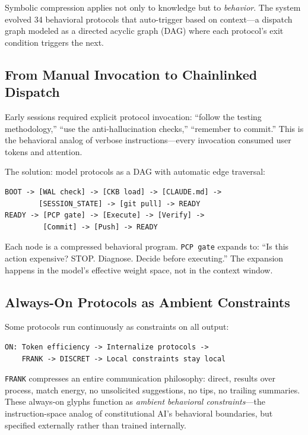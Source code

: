 \documentclass[11pt, a4paper]{article}
\begin{document}
Symbolic compression applies not only to knowledge but to \emph{behavior}. The system evolved 34 behavioral protocols that auto-trigger based on context---a dispatch graph modeled as a directed acyclic graph (DAG) where each protocol's exit condition triggers the next.

\subsection{From Manual Invocation to Chainlinked Dispatch}

Early sessions required explicit protocol invocation: ``follow the testing methodology,'' ``use the anti-hallucination checks,'' ``remember to commit.'' This is the behavioral analog of verbose instructions---every invocation consumed user tokens and attention.

The solution: model protocols as a DAG with automatic edge traversal:

\begin{lstlisting}
BOOT -> [WAL check] -> [CKB load] -> [CLAUDE.md] ->
        [SESSION_STATE] -> [git pull] -> READY
READY -> [PCP gate] -> [Execute] -> [Verify] ->
         [Commit] -> [Push] -> READY
\end{lstlisting}

Each node is a compressed behavioral program. \texttt{PCP gate} expands to: ``Is this action expensive? STOP. Diagnose. Decide before executing.'' The expansion happens in the model's effective weight space, not in the context window.

\subsection{Always-On Protocols as Ambient Constraints}

Some protocols run continuously as constraints on all output:

\begin{lstlisting}
ON: Token efficiency -> Internalize protocols ->
    FRANK -> DISCRET -> Local constraints stay local
\end{lstlisting}

\texttt{FRANK} compresses an entire communication philosophy: direct, results over process, match energy, no unsolicited suggestions, no tips, no trailing summaries. These always-on glyphs function as \emph{ambient behavioral constraints}---the instruction-space analog of constitutional AI's behavioral boundaries, but specified externally rather than trained internally.
\end{document}
